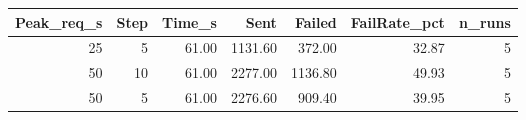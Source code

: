 \begin{tabular}{rrrrrrr}
\toprule
Peak\_req\_s & Step & Time\_s & Sent & Failed & FailRate\_pct & n\_runs \\
\midrule
25 & 5 & 61.00 & 1131.60 & 372.00 & 32.87 & 5 \\
50 & 10 & 61.00 & 2277.00 & 1136.80 & 49.93 & 5 \\
50 & 5 & 61.00 & 2276.60 & 909.40 & 39.95 & 5 \\
\bottomrule
\end{tabular}
